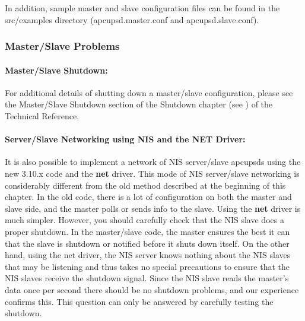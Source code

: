 {{{{{{{{{In addition, sample master and slave configuration files can be found in the
\lt{}src\gt{}/examples directory (apcupsd.master.conf and apcupsd.slave.conf).


\label{Master_002fSlave-Problems}

\subsubsection*{Master/Slave Problems}

\label{index-Master_002fSlave-155}
\label{index-Problems_002c-Master_002fslave-156}

\label{Master_002fSlave-Shutdown}

\paragraph*{Master/Slave Shutdown:}

For additional details of shutting down a master/slave configuration, please
see the Master/Slave Shutdown section of the Shutdown chapter (see 
) of the Technical
Reference. 

\label{Server_002fSlave-Networking-using-NIS-and-the-NET-Driver}

\paragraph*{Server/Slave Networking using NIS and the NET Driver:}

\label{index-NIS-networking-157}
\label{index-Net-driver-158}
It is also possible to implement a network of NIS server/slave apcupsds using
the new 3.10.x code and the {\bf net} driver. This mode of NIS server/slave
networking is considerably different from the old method described at the
beginning of this chapter. In the old code, there is a lot of configuration on
both the master and slave side, and the master polls or sends info to the
slave. Using the {\bf net} driver is much simpler. However, you should
carefully check that the NIS slave does a proper shutdown. In the master/slave
code, the master ensures the best it can that the slave is shutdown or
notified before it shuts down itself. On the other hand, using the net driver,
the NIS server knows nothing about the NIS slaves that may be listening and
thus takes no special precautions to ensure that the NIS slaves receive the
shutdown signal. Since the NIS slave reads the master's data once per second
there should be no shutdown problems, and our experience confirms this.  This
question can only be answered by carefully testing the shutdown.  

}}}}}}}}}
